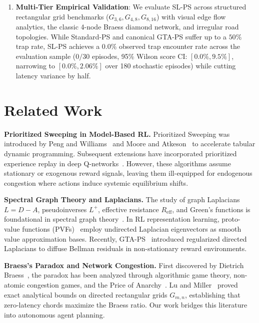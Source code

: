 \documentclass[11pt,a4paper]{article}
\begin{document}
\begin{enumerate}
    \item \textbf{Multi-Tier Empirical Validation}: We evaluate SL-PS across structured rectangular grid benchmarks ($G_{3,6}, G_{4,8}, G_{8,16}$) with visual edge flow analytics, the classic 4-node Braess diamond network, and irregular road topologies. While Standard-PS and canonical GTA-PS suffer up to a $50\%$ trap rate, SL-PS achieves a $0.0\%$ observed trap encounter rate across the evaluation sample ($0/30$ episodes, 95\% Wilson score CI: $[0.0\%, 9.5\%]$, narrowing to $[0.0\%, 2.06\%]$ over 180 stochastic episodes) while cutting latency variance by half.
\end{enumerate}

\section{Related Work}
\label{sec:related}

\textbf{Prioritized Sweeping in Model-Based RL.}
Prioritized Sweeping was introduced by Peng and Williams~\cite{peng1993efficient} and Moore and Atkeson~\cite{moore1993prioritized} to accelerate tabular dynamic programming. Subsequent extensions have incorporated prioritized experience replay in deep Q-networks~\cite{schaul2015prioritized}. However, these algorithms assume stationary or exogenous reward signals, leaving them ill-equipped for endogenous congestion where actions induce systemic equilibrium shifts.

\textbf{Spectral Graph Theory and Laplacians.}
The study of graph Laplacians $L = D - A$, pseudoinverses $L^+$, effective resistance $R_{\text{eff}}$, and Green's functions is foundational in spectral graph theory~\cite{spielman2025sagt}. In RL representation learning, proto-value functions (PVFs)~\cite{mahadevan2007proto} employ undirected Laplacian eigenvectors as smooth value approximation bases. Recently, GTA-PS~\cite{gta_ps2025} introduced regularized directed Laplacians to diffuse Bellman residuals in non-stationary reward environments.

\textbf{Braess's Paradox and Network Congestion.}
First discovered by Dietrich Braess~\cite{braess1968paradoxon}, the paradox has been analyzed through algorithmic game theory, non-atomic congestion games, and the Price of Anarchy~\cite{roughgarden2002bad}. Lu and Miller~\cite{lu2026braess} proved exact analytical bounds on directed rectangular grids $G_{m,n}$, establishing that zero-latency chords maximize the Braess ratio. Our work bridges this literature into autonomous agent planning.
\end{document}
